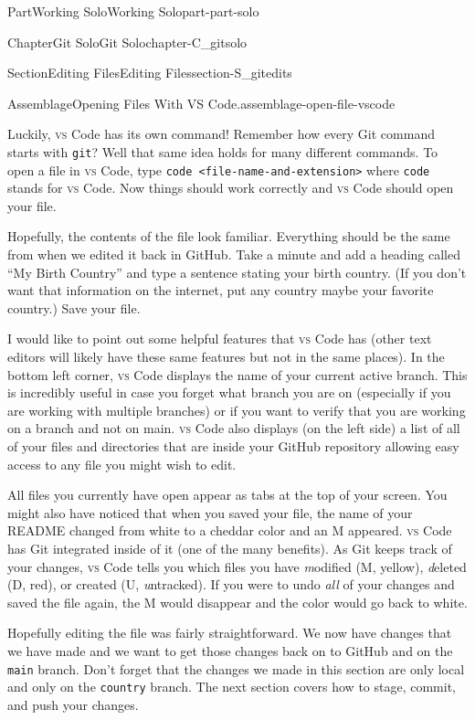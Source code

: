 \documentclass[twoside,10pt,]{book}
\newcommand{\mono}[1]{\texttt{#1}}
\newcommand{\initialism}[1]{\textsc{\MakeLowercase{#1}}}
\DeclareRobustCommand{\initialismintitle}[1]{\texorpdfstring{#1}{#1}}
\begin{document}
\begin{partptx}{Part}{Working Solo}{}{Working Solo}{}{}{part-part-solo}
\begin{chapterptx}{Chapter}{Git Solo}{}{Git Solo}{}{}{chapter-C_gitsolo}
\begin{sectionptx}{Section}{Editing Files}{}{Editing Files}{}{}{section-S_gitedits}
\begin{assemblage}{Assemblage}{Opening Files With \initialismintitle{VS} Code.}{assemblage-open-file-vscode}
\par
Luckily, \initialism{VS} Code has its own command! Remember how every Git command starts with \mono{git}? Well that same idea holds for many different commands. To open a file in \initialism{VS} Code, type \mono{code <file-name-and-extension>} where \mono{code} stands for \initialism{VS} Code. Now things should work correctly and \initialism{VS} Code should open your file.%
\end{assemblage}
Hopefully, the contents of the file look familiar. Everything should be the same from when we edited it back in GitHub. Take a minute and add a heading called ``My Birth Country'' and type a sentence stating your birth country. (If you don't want that information on the internet, put any country \textellipsis{} maybe your favorite country.) Save your file.%
\par
I would like to point out some helpful features that \initialism{VS} Code has (other text editors will likely have these same features but not in the same places). In the bottom left corner, \initialism{VS} Code displays the name of your current active branch. This is incredibly useful in case you forget what branch you are on (especially if you are working with multiple branches) or if you want to verify that you are working on a branch and not on main. \initialism{VS} Code also displays (on the left side) a list of all of your files and directories that are inside your GitHub repository allowing easy access to any file you might wish to edit.%
\par
All files you currently have open appear as tabs at the top of your screen. You might also have noticed that when you saved your file, the name of your README changed from white to a cheddar color and an M appeared. \initialism{VS} Code has Git integrated inside of it (one of the many benefits). As Git keeps track of your changes, \initialism{VS} Code tells you which files you have \emph{m}odified (M, yellow), \emph{d}eleted (D, red), or created (U, \emph{u}ntracked). If you were to undo \emph{all} of your changes and saved the file again, the M would disappear and the color would go back to white.%
\par
Hopefully editing the file was fairly straightforward. We now have changes that we have made and we want to get those changes back on to GitHub and on the \mono{main} branch. Don't forget that the changes we made in this section are only local and only on the \mono{country} branch. The next section covers how to stage, commit, and push your changes.%
\end{sectionptx}

\end{chapterptx}
\end{partptx}
\end{document}
